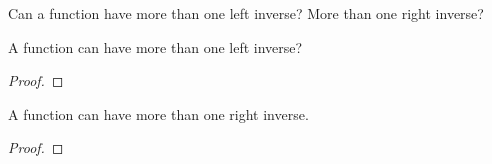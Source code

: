 \documentclass[main.tex]{subfiles}
\begin{document}
\subproblem{}\label{s2p5d}

Can a function have more than one left inverse? More than one right inverse?

\begin{thm}
	A function can have more than one left inverse?\todo{}
\end{thm}
\begin{proof}
	\todo{}
\end{proof}

\begin{thm}
	A function can have more than one right inverse.
\end{thm}
\begin{proof}
	\todo{}
\end{proof}
\end{document}
